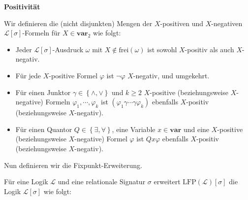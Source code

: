 \begin{defn}
\textbf{Positivität}

Wir definieren die (nicht disjunkten) Mengen der $X$-positiven und
$X$-negativen $\mathcal{L}\left[\sigma\right]$-Formeln für $X\in\mathbf{var}_{2}$
wie folgt:

\begin{itemize}
\item Jeder $\mathcal{L}\left[\sigma\right]$-Ausdruck $\omega$ mit $X\notin\mathrm{frei}\left(\omega\right)$
ist sowohl $X$-positiv als auch $X$-negativ.
\item Für jede $X$-positive Formel $\varphi$ ist $\neg\varphi$ $X$-negativ,
und umgekehrt.
\item Für einen Junktor $\gamma\in\left\{ \wedge,\vee\right\} $ und $k\geqslant2$
$X$-positive (beziehungsweise $X$-negative) Formeln $\varphi_{1},\cdots,\varphi_{k}$
ist $\left(\varphi_{1}\gamma\cdots\gamma\varphi_{k}\right)$ ebenfalls
$X$-positiv (beziehungsweise $X$-negativ).
\item Für einen Quantor $Q\in\left\{ \exists,\forall\right\} $, eine Variable
$x\in\mathbf{var}$ und eine $X$-positive (beziehungsweise $X$-negative)
Formel $\varphi$ ist $Qx\varphi$ ebenfalls $X$-positiv (beziehungsweise
$X$-negativ).
\end{itemize}
\end{defn}
Nun definieren wir die Fixpunkt-Erweiterung.
\begin{defn}
\label{def:lfp}Für eine Logik $\mathcal{L}$ und eine relationale
Signatur $\sigma$ erweitert $\mathrm{LFP}\left(\mathcal{L}\right)\left[\sigma\right]$
die Logik $\mathcal{L}\left[\sigma\right]$ wie folgt:
\end{defn}
